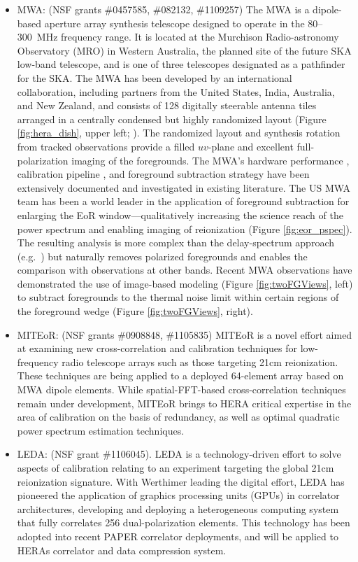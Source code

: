 \documentclass[preprint]{aastex}
\begin{document}
\begin{itemize}[noitemsep,nolistsep]
\item{MWA:} (NSF grants \#0457585, \#082132, \#1109257) 
The MWA is a dipole-based aperture array synthesis telescope designed
to operate in the 80--300~MHz frequency range.
It is located at the
Murchison Radio-astronomy Observatory (MRO) in Western Australia, the
planned site of the future SKA low-band
telescope, and is one of three telescopes designated as a pathfinder
for the SKA. 
The MWA has been developed by an international collaboration,
including partners from the United States, India, Australia, and New
Zealand, and consists of
128 digitally steerable antenna tiles arranged in a centrally
condensed but highly randomized layout (Figure \ref{fig:hera_dish}, upper left;
\citealt{tingay_et_al2013_trunc}). The randomized layout and synthesis rotation
from tracked observations provide a filled $uv$-plane and excellent
full-polarization imaging of the foregrounds.
The MWA's hardware performance \citep{bowman_et_al2007a}, calibration pipeline
\citep{mitchell_et_al2008}, and foreground subtraction strategy \citep{morales_et_al2006a}
have been extensively documented and investigated
in existing literature.
The US MWA team has been a world leader in the application of 
foreground subtraction for
enlarging the EoR window---qualitatively increasing the science %
reach of the power spectrum and enabling imaging of reionization (Figure
\ref{fig:eor_pspec}). The resulting analysis is more complex than the
delay-spectrum approach (e.g.\ \citealt{hazelton_et_al2013}) but naturally
removes polarized foregrounds \citep{moore_et_al2013} and enables the
comparison with observations at other bands. Recent MWA observations have
demonstrated the use of image-based modeling (Figure \ref{fig:twoFGViews}, left) to
subtract foregrounds to the thermal noise limit 
within certain regions of the foreground wedge (Figure \ref{fig:twoFGViews}, right). %

\item{MITEoR:} (NSF grants \#0908848, \#1105835) MITEoR is a novel effort aimed at
examining new cross-correlation and calibration techniques for low-frequency radio telescope
arrays such as those targeting 21cm reionization.  These techniques are being applied
to a deployed 64-element array based on MWA dipole elements.  While spatial-FFT-based cross-correlation
techniques remain under development, MITEoR brings to HERA critical expertise in the area
of calibration on the basis of redundancy, as well as optimal quadratic power spectrum estimation techniques.

\item{LEDA:} (NSF grant \#1106045). LEDA is a technology-driven effort to solve aspects of calibration relating
to an experiment targeting the global 21cm reionization signature.  With Werthimer leading the digital effort,
LEDA has pioneered the application of graphics processing units (GPUs) in correlator architectures, developing
and deploying a heterogeneous computing system that fully correlates 256 dual-polarization elements.  This
technology has been adopted into recent PAPER correlator deployments, and will be applied to HERAs correlator
and data compression system.
\end{itemize}
\end{document}
